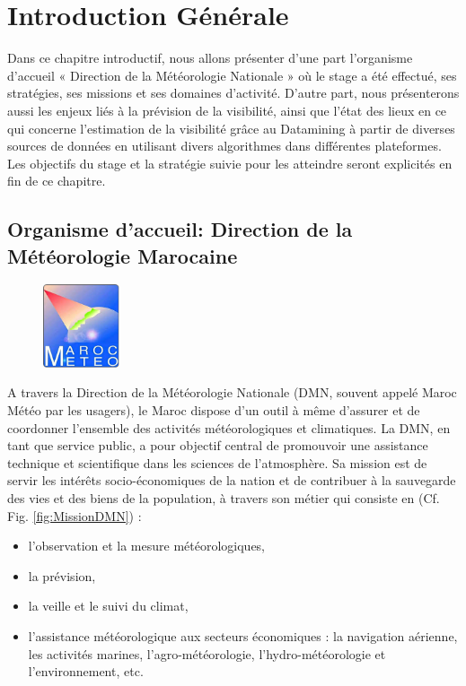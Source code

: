 \chapter[Introduction Générale]{Introduction Générale}
\label{Introduction}

\chapterabstract
{
Dans ce chapitre introductif, nous allons présenter d'une part l'organisme d'accueil « Direction de la Météorologie 
Nationale » où le stage a été effectué, ses stratégies, ses missions et ses domaines d'activité. D'autre part, 
nous présenterons aussi les enjeux liés à la prévision de la visibilité, ainsi que l’état des lieux en ce qui concerne 
l'estimation de la visibilité grâce au Datamining à partir de diverses sources de données en utilisant divers algorithmes dans différentes plateformes.
Les objectifs du stage et la stratégie suivie pour les atteindre seront explicités en fin de ce chapitre.
}
\pagestyle{plain}

\section{Organisme d’accueil: Direction de la Météorologie Marocaine}
\begin{figure}
    \vspace{-0.5 cm}    
    \includegraphics[width=0.2\textwidth]{img/logo_dmn.png}
    \vspace{-1 cm}
\end{figure}
A travers la Direction de la Météorologie Nationale (DMN, souvent appelé Maroc Météo par les usagers), le Maroc dispose d’un outil à même d'assurer et de coordonner l'ensemble des activités météorologiques et climatiques. La DMN, en tant que service public, a pour objectif central de promouvoir une assistance technique et scientifique dans les sciences de l'atmosphère. Sa mission est de servir les intérêts socio-économiques de la nation et de contribuer à la
sauvegarde des vies et des biens de la population, à travers son métier qui consiste en (Cf. Fig. \ref{fig:MissionDMN}) :
\begin{itemize}
\item[\ding{224}] l'observation et la mesure météorologiques,
\item[\ding{224}] la prévision,
\item[\ding{224}] la veille et le suivi du climat,
\item[\ding{224}] l'assistance météorologique aux secteurs économiques : la navigation aérienne, les activités marines, l'agro-météorologie, l'hydro-météorologie et l'environnement, etc.\\
\end{itemize}

